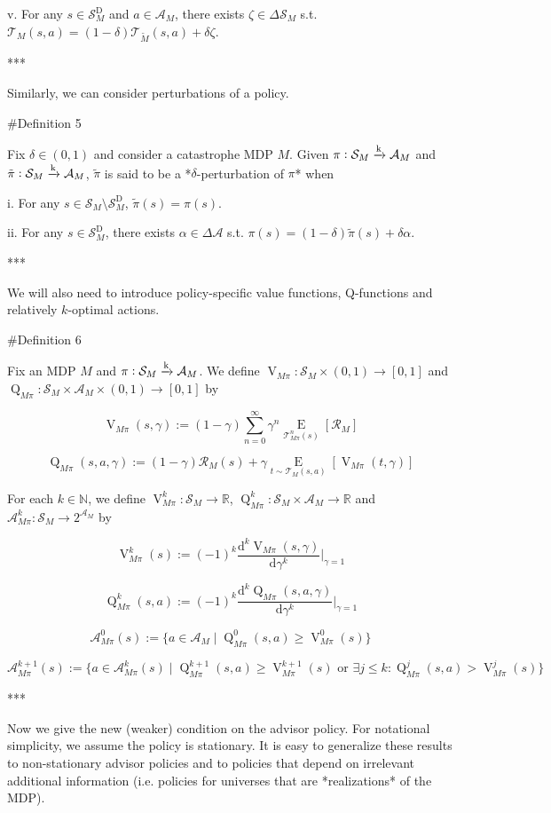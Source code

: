 \documentclass[a4paper]{article}
\newcommand{\AP}[1]{\left(#1\right)}
\newcommand{\AB}[1]{\left[#1\right]}
\newcommand{\Ea}[2]{\underset{#1}{\operatorname{E}}\AB{#2}}
\newcommand{\D}{\mathrm{d}}
\newcommand{\Nats}{\mathbb{N}}
\newcommand{\Reals}{\mathbb{R}}
\newcommand{\M}{\xrightarrow{\textnormal{k}}}
\newcommand{\A}{\mathcal{A}}
\newcommand{\St}{\mathcal{S}}
\newcommand{\T}{\mathcal{T}}
\newcommand{\R}{\mathcal{R}}
\newcommand{\RMD}{\mathrm{D}}
\newcommand{\SD}{\St^{\RMD}}
\newcommand{\V}{\operatorname{V}}
\newcommand{\Q}{\operatorname{Q}}
\begin{document}
v. For any $s \in \SD_M$ and $a \in \A_M$, there exists $\zeta \in \Delta\St_M$ s.t. $\T_{M}\AP{s,a}=(1-\delta)\T_{\tilde{M}}\AP{s,a}+\delta\zeta$.

***

Similarly, we can consider perturbations of a policy.

\#Definition 5

Fix $\delta\in(0,1)$ and consider a catastrophe MDP $M$. Given $\pi: \St_M \M \A_M$ and $\tilde{\pi}: \St_M \M \A_M$, $\tilde{\pi}$ is said to be a *$\delta$-perturbation of $\pi$* when

i. For any $s \in \St_M \setminus \SD_M$, $\tilde{\pi}(s) = \pi(s)$.

ii. For any $s \in \SD_M$, there exists $\alpha\in\Delta\A$ s.t. $\pi(s)=(1-\delta)\tilde{\pi}(s)+\delta\alpha$.

***

We will also need to introduce policy-specific value functions, Q-functions and relatively $k$-optimal actions.

\#Definition 6

Fix an MDP $M$ and $\pi: \St_M \M \A_M$. We define $\V_{M\pi}: \St_M \times (0,1) \rightarrow [0,1]$ and $\Q_{M\pi}: \St_M \times \A_M \times (0,1) \rightarrow [0,1]$ by

$$\V_{M\pi}(s,\gamma) := (1-\gamma) \sum_{n=0}^\infty \gamma^n \Ea{\T_{M\pi}^n(s)}{\R_M}$$

$$\Q_{M\pi}(s,a,\gamma) := (1-\gamma) \R_M(s) + \gamma \Ea{t \sim \T_{M}(s,a)}{\V_{M\pi}(t,\gamma)}$$

For each $k \in \Nats$, we define $\V_{M\pi}^k: \St_M \rightarrow \Reals$, $\Q_{M\pi}^k: \St_M \times \A_M \rightarrow \Reals$ and $\A_{M\pi}^k: \St_M \rightarrow 2^{\A_M}$ by

$$\V_{M\pi}^k(s) := (-1)^k \frac{\D^k \V_{M\pi}(s,\gamma)}{\D\gamma^k}\bigg\vert_{\gamma=1}$$

$$\Q_{M\pi}^k(s,a) := (-1)^k \frac{\D^k \Q_{M\pi}(s,a,\gamma)}{\D\gamma^k}\bigg\vert_{\gamma=1}$$

$$\A_{M\pi}^0(s) := \{a \in \A_M \mid \Q_{M\pi}^0(s,a) \geq \V_{M\pi}^0(s)\}$$

$$\A_{M\pi}^{k+1}(s) := \{a \in \A_{M\pi}^k(s) \mid \Q_{M\pi}^{k+1}(s,a) \geq \V_{M\pi}^{k+1}(s) \text{ or } \exists j \leq k: \Q_{M\pi}^{j}(s,a) > \V_{M\pi}^{j}(s)\}$$

***

Now we give the new (weaker) condition on the advisor policy. For notational simplicity, we assume the policy is stationary. It is easy to generalize these results to non-stationary advisor policies and to policies that depend on irrelevant additional information (i.e. policies for universes that are *realizations* of the MDP).
\end{document}
